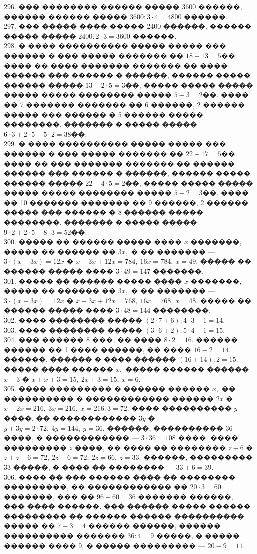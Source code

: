 \documentclass[12pt]{article}
\begin{document}
296. ��� �������� ������ ����� 3600 ������, ������ ������ ����� $3600:3\cdot4=4800$ ������.\\
297. ��� ����� ���� ����� 2400 ������, ������ ����� ����� $2400:2\cdot3=3600$ ������.\\
298. � ���� ���������� ����� ����� ��� ������ � ��� ����� ������� �� $18-13=5$��. ���� �� ���� ������� ������� �� ���� ������ ��� ������ � ������, ������ ����� ������ ����� $13-2\cdot5=3$��, ����� ����� ����� ����� ����� �������� ����� $5-3=2$��. ���� �� 7 ������� ������� �� 6 ������, 2 ������ ����� ��� ������ � 5 ������ ����� ��������, ������� � ����� ����� $6\cdot3+2\cdot5+5\cdot2=38$��.\\
299. � ���� ���������� ����� ����� ��� ������ � ��� ����� ������� �� $22-17=5$��. ���� �� ��� ������� ������� �� ������ ������ ��� ������ � ������, ������ ����� ������ ����� $22-4\cdot5=2$��, ����� ����� ����� ����� ����� �������� ����� $5-2=3$��. ���� �� 10 ������� ������� �� 9 ������, 2 ������ ����� ��� ������ � 8 ������ ����� ��������, ������� � ����� ����� $9\cdot2+2\cdot5+8\cdot3=52$��.\\
300. ����� �� ������ ����� ���� $x$ �������, ����� �� ������ �� $3x,$ � �� ������� --- $3\cdot(x+3x)=12x$ � $x+3x+12x=784,\ 16x=784,\ x=49.$ ����� �� ������ ����� ���� $3\cdot49=147$ �������.\\
301. ����� �� ������ ����� ���� $x$ �������, ����� �� ������ �� $3x,$ � �� ������� --- $3\cdot(x+3x)=12x$ � $x+3x+12x=768,\ 16x=768,\ x=48.$ ����� �� ������ ����� ���� $3\cdot48=144$ ��������.\\
302. ���� �������� ����� $(2\cdot7+6):4\cdot3-1=14.$\\
303. ���� �������� ����� $(3\cdot6+2):5\cdot4-1=15.$\\
304. ��� ������ 8 ���, �� ���� $8\cdot2=16.$ ������ ������ �� 1 ���� ������, �� ���� $16-2=14.$ ������, ������ � ���� ������ $(16+14):2=15.$ ����� ���� ������ $x,$ ����� ������ ������ $x+3$ � $x+x+3=15,\ 2x+3=15,\ x=6.$\\
305. ���� ��������� � ������ ������ $x,$ �� ���������� � ������������ ������ $2x$ � $x+2x=216,\ 3x=216,\ x=216:3=72.$ ���� ���������� $y$ ����, �� ������������ $3y$ � $y+3y=2\cdot72,\ 4y=144,\ y=36.$ ������, ���������� 36 ����, � ������������ --- $3\cdot36=108$ ����. ���� ��������� $z$ ����, �� ���� �� �������� $z+6$ � $z+z+6=72,\ 2z+6=72,\ 2z=66,\ z=33.$ ������, ��������� 33 �����, � ���� �� �������� --- $33+6=39.$\\
306. ���� �� ��� ������ ���� �� �������� ���������, �� ������������ �� $20\cdot3=60$ �������, ��� �� $96-60=36$ ������� ������, ��� ���� ������. ��� ������ ����� ������ ��������� �� ������ ������ ���������� ����� �� $7-3=4$ ������ ������, ������ ���������� ������� $36:4=9$ �����, � ����� ������ ���� 9, � ����� ��������� --- $20-9=11.$\\
\end{document}
